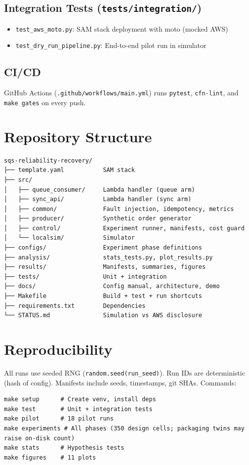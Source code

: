 \subsection{Integration Tests (\texttt{tests/integration/})}

\begin{itemize}
    \item \texttt{test\_aws\_moto.py}: SAM stack deployment with moto (mocked AWS)
    \item \texttt{test\_dry\_run\_pipeline.py}: End-to-end pilot run in simulator
\end{itemize}

\subsection{CI/CD}

GitHub Actions (\texttt{.github/workflows/main.yml}) runs \texttt{pytest}, \texttt{cfn-lint}, and \texttt{make gates} on every push.

\section{Repository Structure}

\begin{verbatim}
sqs-reliability-recovery/
├── template.yaml           SAM stack
├── src/
│   ├── queue_consumer/     Lambda handler (queue arm)
│   ├── sync_api/           Lambda handler (sync arm)
│   ├── common/             Fault injection, idempotency, metrics
│   ├── producer/           Synthetic order generator
│   ├── control/            Experiment runner, manifests, cost guard
│   └── localsim/           Simulator
├── configs/                Experiment phase definitions
├── analysis/               stats_tests.py, plot_results.py
├── results/                Manifests, summaries, figures
├── tests/                  Unit + integration
├── docs/                   Config manual, architecture, demo
├── Makefile                Build + test + run shortcuts
├── requirements.txt        Dependencies
└── STATUS.md               Simulation vs AWS disclosure
\end{verbatim}

\section{Reproducibility}

All runs use seeded RNG (\texttt{random.seed(run\_seed)}). Run IDs are deterministic (hash of config). Manifests include seeds, timestamps, git SHAs. Commands:
\begin{verbatim}
make setup      # Create venv, install deps
make test       # Unit + integration tests
make pilot      # 18 pilot runs
make experiments # All phases (350 design cells; packaging twins may raise on-disk count)
make stats      # Hypothesis tests
make figures    # 11 plots
\end{verbatim}

